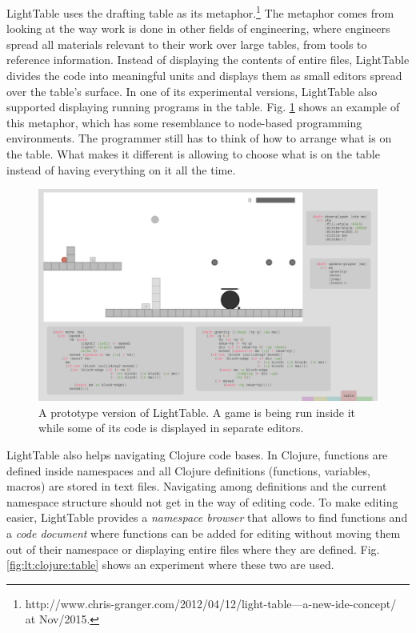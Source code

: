 \documentclass{./llncs2e/llncs}
\begin{document}

	LightTable uses the drafting table as its metaphor.\footnote{http://www.chris-granger.com/2012/04/12/light-table---a-new-ide-concept/ at Nov/2015.}
	The metaphor comes from looking at the way work is done in other fields of engineering, where engineers spread all materials relevant to their work over large tables, from tools to reference information. 
	Instead of displaying the contents of entire files, LightTable divides the code into meaningful units and displays them as small editors spread over the table's surface. 
	In one of its experimental versions, LightTable also supported displaying running programs in the table. 
	Fig. \ref{fig:lt:draft:table} shows an example of this metaphor, which has some resemblance to node-based programming environments. 
	The programmer still has to think of how to arrange what is on the table.
	What makes it different is allowing to choose what is on the table instead of having everything on it all the time.

	\begin{figure}
	  \centering
	  \includegraphics[width=1.0\textwidth]{img/lt_game_example__inv}
	    \caption{A prototype version of LightTable. A game is being run inside it while some of its code is displayed in separate editors.}
	  \label{fig:lt:draft:table}
	\end{figure} 

	LightTable also helps navigating Clojure code bases.
	In Clojure, functions are defined inside namespaces and all Clojure definitions (functions, variables, macros) are stored in text files. 
	Navigating among definitions and the current namespace structure should not get in the way of editing code. 
	To make editing easier, LightTable provides a \emph{namespace browser} that allows to find functions and a \emph{code document} where functions can be added for editing without moving them out of their namespace or displaying entire files where they are defined. 
	Fig. \ref{fig:lt:clojure:table} shows an experiment where these two are used.
\end{document}
